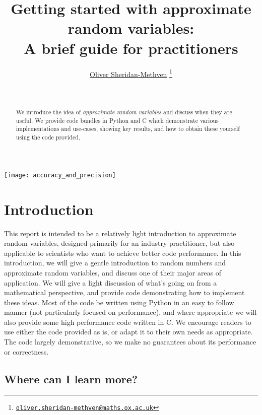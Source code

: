 \documentclass[11pt,a4paper,twoside,english]{extarticle}
\title{Getting started with approximate random variables:\\ A brief guide for practitioners}
\author{\href{mailto:oliver.sheridan-methven@maths.ox.ac.uk}{Oliver Sheridan-Methven}%
\thanks{\href{mailto:oliver.sheridan-methven@maths.ox.ac.uk}%
{\texttt{oliver.sheridan-methven@maths.ox.ac.uk}}}
}
\date{\datedayname\ \nth{\number\day} \monthname\  \number\year}
\begin{document}
\linenumbers
\pagestyle{empty}
\maketitle
{}

\begin{abstract}
We introduce the idea of \emph{approximate random variables} and discuss when they are useful. We provide code bundles in Python and C which demonstrate various implementations and use-cases, showing key results, and how to obtain these yourself using the code provided.  
\end{abstract}


\vfill
\centerline{\texttt{[image: accuracy\_and\_precision]}}
\vfill

\clearpage
\tableofcontents
\cleardoublepage
{}
\pagestyle{fancy}

\clearpage
\section{Introduction}

This report is intended to be a relatively light introduction to approximate random variables, designed primarily for an industry practitioner, but also applicable to scientists who want to achieve better code performance. In this introduction, we will give a gentle introduction to random numbers and approximate random variables, and discuss one of their major areas of application. We will give a light discussion of what's going on from a mathematical perspective, and provide code demonstrating how to implement these ideas. Most of the code be written using Python in an easy to follow manner (not particularly focused on performance), and where appropriate we will also provide some high performance code written in C. We encourage readers to use either the code provided as is, or adapt it to their own needs as appropriate. The code largely demonstrative, so we make no guarantees about its performance or correctness. 

\subsection{Where can I learn more?}
\label{sec:where_can_i_learn_more}
\end{document}
